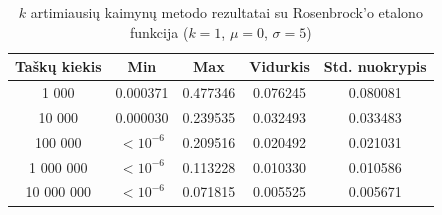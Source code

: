 \begin{table}[H]
    \centering
    \begin{tabular}{|c|c|c|c|c|}
        \hline
        \textbf{Taškų kiekis} & \textbf{Min} & \textbf{Max} & \textbf{Vidurkis} & \textbf{Std. nuokrypis} \\ \hline
        1 000        & 0.000371 & 0.477346 & 0.076245 & 0.080081 \\ \hline
        10 000       & 0.000030 & 0.239535 & 0.032493 & 0.033483 \\ \hline
        100 000      & $<10^{-6}$ & 0.209516 & 0.020492 & 0.021031 \\ \hline
        1 000 000    & $<10^{-6}$ & 0.113228 & 0.010330 & 0.010586 \\ \hline
        10 000 000   & $<10^{-6}$ & 0.071815 & 0.005525 & 0.005671 \\ \hline
    \end{tabular}
    \caption{$k$ artimiausių kaimynų metodo rezultatai su Rosenbrock'o etalono funkcija ($k = 1$, $\mu = 0$, $\sigma = 5$)}
\end{table}